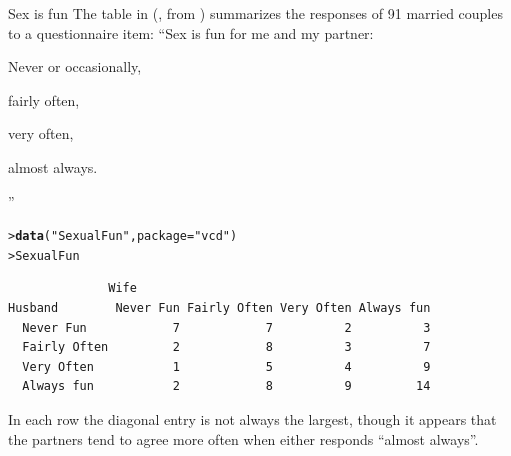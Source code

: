 \documentclass[10pt,krantz2]{krantz}\usepackage[]{graphicx}\usepackage[]{color}
\makeatletter
\newcommand{\hlstr}[1]{\textcolor[rgb]{0.192,0.494,0.8}{#1}}%
\newcommand{\hlstd}[1]{\textcolor[rgb]{0.345,0.345,0.345}{#1}}%
\newcommand{\hlkwc}[1]{\textcolor[rgb]{0.333,0.667,0.333}{#1}}%
\newcommand{\hlkwd}[1]{\textcolor[rgb]{0.737,0.353,0.396}{\textbf{#1}}}%
\newenvironment{kframe}{%
 \def\at@end@of@kframe{}%
 \ifinner\ifhmode%
  \def\at@end@of@kframe{\end{minipage}}%
  \begin{minipage}{\columnwidth}%
 \fi\fi%
 \def\FrameCommand##1{\hskip\@totalleftmargin \hskip-\fboxsep
 \colorbox{shadecolor}{##1}\hskip-\fboxsep
     \hskip-\linewidth \hskip-\@totalleftmargin \hskip\columnwidth}%
 \MakeFramed {\advance\hsize-\width
   \@totalleftmargin\z@ \linewidth\hsize
   \@setminipage}}%
 {\par\unskip\endMakeFramed%
 \at@end@of@kframe}
\newenvironment{knitrout}{}{} %
\renewenvironment{knitrout}{\small\renewcommand{\baselinestretch}{.85}}{} %
\makeatother
\begin{document}
\begin{Example}[sexisfun1]{Sex is fun}
The  table in 
(\citet[Table 2.10]{Agresti:90}, from \citet{Hout-etal:87})
 summarizes the responses of 91
married couples to a questionnaire item:
``Sex is fun for me and my partner:
\begin{seriate}
  \item Never or occasionally,
  \item fairly often,
  \item very often,
  \item almost always.
\end{seriate}
''
\begin{knitrout}
\color{fgcolor}\begin{kframe}
\begin{alltt}
\hlstd{> }\hlkwd{data}\hlstd{(}\hlstr{"SexualFun"}\hlstd{,} \hlkwc{package} \hlstd{=} \hlstr{"vcd"}\hlstd{)}
\hlstd{> }\hlstd{SexualFun}
\end{alltt}
\begin{verbatim}
              Wife
Husband        Never Fun Fairly Often Very Often Always fun
  Never Fun            7            7          2          3
  Fairly Often         2            8          3          7
  Very Often           1            5          4          9
  Always fun           2            8          9         14
\end{verbatim}
\end{kframe}
\end{knitrout}

In each row the diagonal entry is not always the largest, though it
appears that the partners tend to agree more often when either responds
``almost always''.
%
\end{Example}
\end{document}
